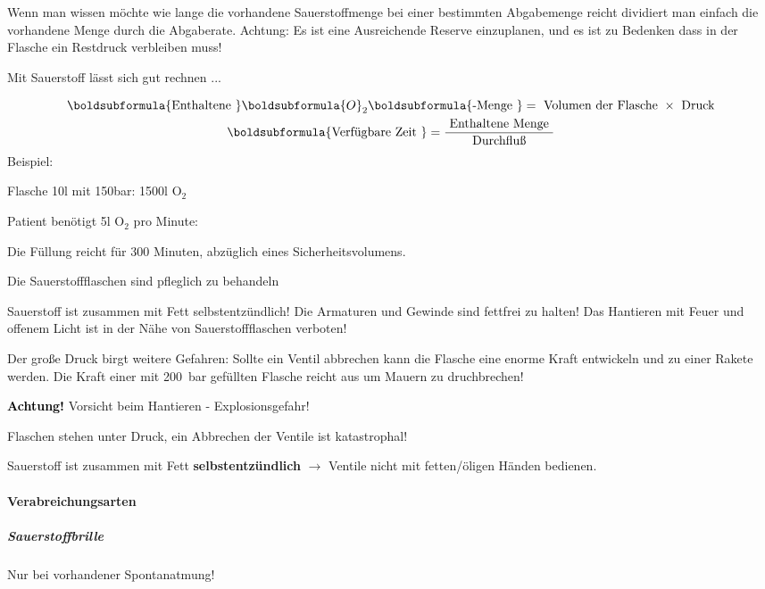 \documentclass{article}
\newcommand\gSub[1]{\ensuremath{{}_{\text{#1}}}}
\newcommand\gEs[1]{\textbf{\textcolor[rgb]{0.0,0.0,0.5019608}{#1}}}
\newcommand\gEs[1]{\textbf{\textcolor[rgb]{0.0,0.0,0.5019608}{#1}}}
\newcommand\gCa[1]{\textbf{\textcolor{black}{#1}}}
\begin{document}
{\mdseries
Wenn man wissen m\"ochte wie lange die vorhandene Sauerstoffmenge bei
einer bestimmten Abgabemenge reicht dividiert man einfach die
vorhandene Menge durch die Abgaberate. Achtung: Es ist eine
Ausreichende Reserve einzuplanen, und es ist zu Bedenken dass in der
Flasche ein Restdruck verbleiben muss! }

{\mdseries\color{black}
Mit Sauerstoff l\"asst sich gut rechnen ...}

\[\begin{gathered}\boldsubformula{\text{Enthaltene
}}\boldsubformula{O}_{2}\boldsubformula{\text{{}-Menge }}=\text{
Volumen der Flasche }\times \text{
Druck}\\\boldsubformula{\text{Verf\"ugbare Zeit }}=\frac{\text{
Enthaltene Menge }}{\text{ Durchflu{\ss} }}\end{gathered}\]
Beispiel:

Flasche 10l mit 150bar: 1500l  O\gSub{2}

Patient ben\"otigt 5l O\gSub{2} pro Minute: 

Die F\"ullung reicht f\"ur 300 Minuten, abz\"uglich eines
Sicherheitsvolumens.

{\mdseries\color{black}
Die Sauerstoffflaschen sind pfleglich zu behandeln}

Sauerstoff ist zusammen mit Fett selbstentz\"undlich! Die Armaturen und
Gewinde sind fettfrei zu halten! Das Hantieren mit Feuer und offenem
Licht ist in der N\"ahe von Sauerstoffflaschen verboten! 

Der gro{\ss}e Druck birgt weitere Gefahren: Sollte ein Ventil abbrechen
kann die Flasche eine enorme Kraft entwickeln und zu einer Rakete
werden. Die Kraft einer mit 200~bar gef\"ullten Flasche reicht aus um
Mauern zu druchbrechen!  

{\mdseries\color{black}
\gCa{Achtung!} Vorsicht beim Hantieren -  Explosionsgefahr!}

{\mdseries\color{black}
Flaschen stehen unter Druck, ein Abbrechen der Ventile ist
katastrophal!}

{\mdseries\color{black}
Sauerstoff ist zusammen mit Fett
\gEs{selbstentz\"undlich} ${\rightarrow}$ Ventile
nicht mit fetten/\"oligen H\"anden bedienen.}

\paragraph{Verabreichungsarten}
\subparagraph{Sauerstoffbrille}
{\mdseries
Nur bei vorhandener Spontanatmung!}
\end{document}
